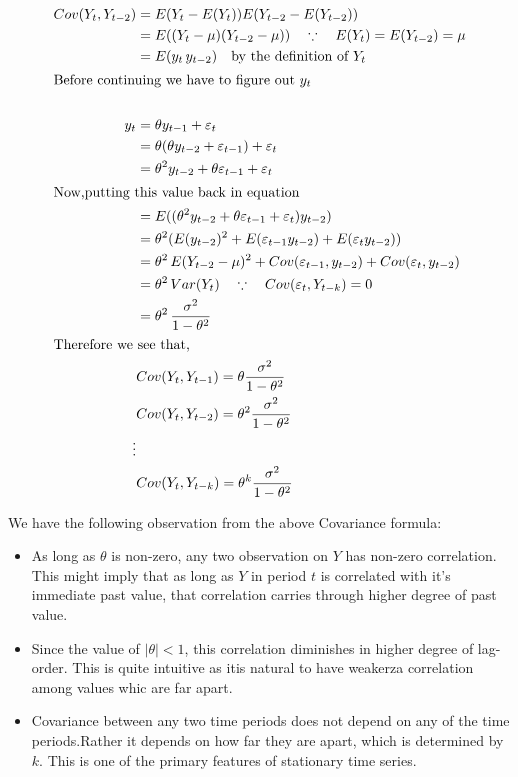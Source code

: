 \documentclass{book}
\begin{document}
\begin{equation}
		\begin{split}
		Cov(Y_t,Y_{t-2}) & =E(Y_t-E(Y_t))E(Y_{t-2}-E(Y_{t-2}))\\
		& =E((Y_t-\mu)(Y_{t-2}-\mu))\quad \because \quad E(Y_t)=E(Y_{t-2})=\mu\\
		& =E(y_t\, y_{t-2})\quad \text{by the definition of $Y_t$}\\
\intertext{Before continuing we have to figure out $y_t$}\\
		y_t & =\theta y_{t-1}+\varepsilon_t\\
		& =\theta (\theta y_{t-2}+\varepsilon_{t-1})+\varepsilon_t\\
		& =\theta^2 y_{t-2}+\theta \varepsilon_{t-1}+\varepsilon_t\\
\intertext{Now,putting this value back in equation}
		& =E((\theta^2 y_{t-2}+\theta \varepsilon_{t-1}+\varepsilon_t)y_{t-2})\\
		& =\theta^2 (E(y_{t-2})^2+E(\varepsilon_{t-1} y_{t-2})+E(\varepsilon_t y_{t-2}))\\
		& =\theta^2 \, E(Y_{t-2}-\mu)^2+Cov(\varepsilon_{t-1},y_{t-2})+Cov(\varepsilon_t,y_{t-2})\\
		& =\theta^2 \, Var(Y_t)\quad \because \quad Cov(\varepsilon_t,Y_{t-k})=0\\
		& =\theta^2 \, \frac{\sigma^2}{1-\theta^2}\\
\intertext{Therefore we see that,}
& Cov(Y_t,Y_{t-1}) =\theta \frac{\sigma^2}{1-\theta^2}\\
& Cov(Y_t,Y_{t-2}) =\theta^2 \frac{\sigma^2}{1-\theta^2}\\
\vdots\\
& Cov(Y_t,Y_{t-k}) =\theta^k \frac{\sigma^2}{1-\theta^2}
		\end{split}
		\label{eqcovk}
	\end{equation}
	
We have the following observation from the above Covariance formula:
\begin{itemize}
	\item As long as $\theta$ is non-zero, any two observation on $Y$ has non-zero correlation. This might imply that as long as $Y$ in period $t$ is correlated with it's immediate past value, that correlation carries through higher degree of past value.
	\item Since the value of $|\theta|<1$, this correlation diminishes in higher degree of lag-order. This is quite intuitive as itis natural to have weakerza correlation among values whic are far apart. 
	\item Covariance between any two time periods does not depend on any of the time periods.Rather it depends on how far they are apart, which is determined by $k$. This is one of the primary features of stationary time series. 	
\end{itemize}
\end{document}
